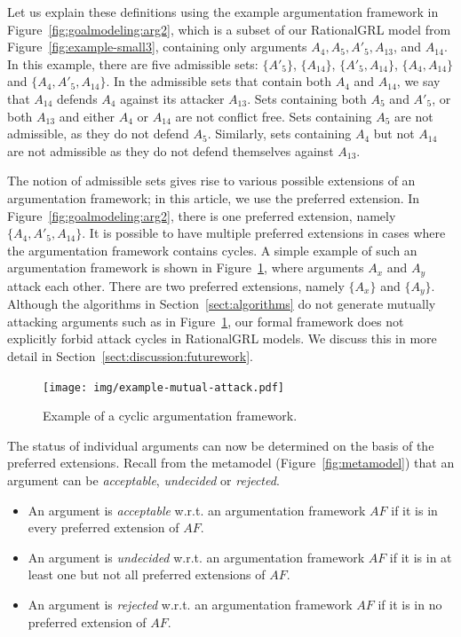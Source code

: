 Let us explain these definitions using the example argumentation framework in Figure~\ref{fig:goalmodeling:arg2}, which is a subset of our RationalGRL model from Figure~\ref{fig:example-small3}, containing only arguments $A_4, A_{5},A'_{5},A_{13}$, and $A_{14}$. In this example, there are five admissible sets: $\{A'_{5}\}$, $\{A_{14}\}$, $\{A'_{5},A_{14}\}$, $\{A_4, A_{14}\}$ and $\{A_4, A'_5, A_{14}\}$. In the admissible sets that contain both $A_{4}$ and $A_{14}$, we say that $A_{14}$ defends $A_4$ against its attacker $A_{13}$. Sets containing both $A_{5}$ and $A'_{5}$, or both $A_{13}$ and either $A_4$ or $A_{14}$ are not conflict free. Sets containing $A_5$ are not admissible, as they do not defend $A_5$. Similarly, sets containing $A_4$ but not $A_{14}$ are not admissible as they do not defend themselves against $A_{13}$. 

The notion of admissible sets gives rise to various possible extensions of an argumentation framework; in this article, we use the preferred extension. In Figure~\ref{fig:goalmodeling:arg2}, there is one preferred extension, namely $\{A_4, A'_5, A_{14}\}$. It is possible to have multiple preferred extensions in cases where the argumentation framework contains cycles. A simple example of such an argumentation framework is shown in Figure~\ref{fig:goalmodeling:arg3}, where arguments $A_x$ and $A_y$ attack each other. There are two preferred extensions, namely $\{A_x\}$ and $\{A_y\}$. Although the algorithms in Section~\ref{sect:algorithms} do not generate mutually attacking arguments such as in Figure~\ref{fig:goalmodeling:arg3}, our formal framework does not explicitly forbid attack cycles in RationalGRL models. We discuss this in more detail in Section~\ref{sect:discussion:futurework}.

\begin{figure}[ht]
\centering
\texttt{[image: img/example-mutual-attack.pdf]}
\caption{Example of a cyclic argumentation framework.}
\label{fig:goalmodeling:arg3}
\end{figure}

The status of individual arguments can now be determined on the basis of the preferred extensions. Recall from the metamodel (Figure~\ref{fig:metamodel}) that an argument can be \emph{acceptable}, \emph{undecided} or \emph{rejected}. 

\begin{definition} 
\label{def:acceptability}
\begin{itemize}
\item An argument is \emph{acceptable} w.r.t. an argumentation framework $AF$ if it is in every preferred extension of $AF$. 
\item An argument is \emph{undecided} w.r.t. an argumentation framework $AF$ if it is in at least one but not all preferred extensions of $AF$. 
\item An argument is \emph{rejected} w.r.t. an argumentation framework $AF$ if it is in no preferred extension of $AF$. 
\end{itemize}
\end{definition}

